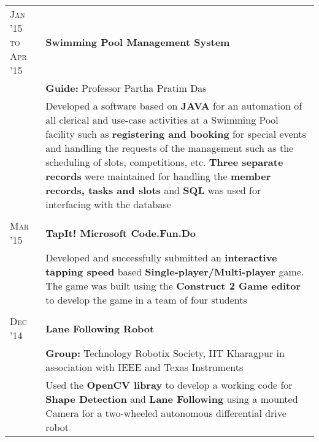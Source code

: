 \documentclass[a4paper,10pt]{extarticle} %
\begin{document}
\begin{tabular}{R{3.0cm}|p{15.0cm}}
\textsc{Jan '15 to Apr '15} & \textbf{Swimming Pool Management System}\\
& \textbf{Guide: }\textmd{Professor Partha Pratim Das}\\
& \textmd{Developed a software based on \textbf{JAVA} for an automation of all clerical and use-case activities at a Swimming Pool facility such as \textbf{registering and booking} for special events and handling the requests of the management such as the scheduling of slots, competitions, etc. \textbf{Three separate records} were maintained for handling the \textbf{member records, tasks and slots} and \textbf{SQL} was used for interfacing with the database}\\
 \\

\textsc{Mar '15} & \textbf{TapIt! Microsoft Code.Fun.Do}\\
& \textmd{Developed and successfully submitted an \textbf{interactive tapping speed} based \textbf{Single-player/Multi-player} game. The game was built using the \textbf{Construct 2 Game editor} to develop the game in a team of four students}\\
 \\

\textsc{Dec '14} & \textbf{Lane Following Robot} \\
& \textbf{Group: }\textmd{Technology Robotix Society}, IIT Kharagpur in association with IEEE and Texas Instruments\\
& \textmd{Used the \textbf{OpenCV libray} to develop a working code for \textbf{Shape Detection} and \textbf{Lane Following} using a mounted Camera for a two-wheeled autonomous differential drive robot}\\

\end{tabular}

\end{document}
